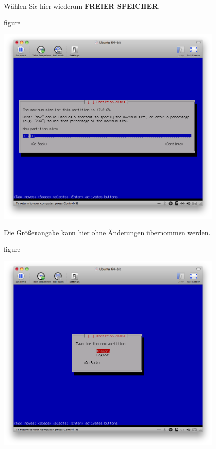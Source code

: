Wählen Sie hier wiederum \textbf{FREIER SPEICHER}.

\begin{nofloat}{figure}
\begin{center}
\includegraphics[width=0.85\textwidth]{screenshots/15_ubuntu_install.png}
\end{center}
\end{nofloat}

\pagebreak
Die Größenangabe kann hier ohne Änderungen übernommen werden.

\begin{nofloat}{figure}
\begin{center}
\includegraphics[width=0.85\textwidth]{screenshots/16_ubuntu_install.png}
\end{center}
\end{nofloat}

